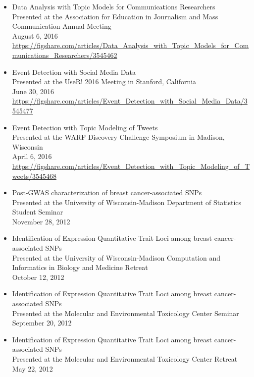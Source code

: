 \begin{itemize}
\item Data Analysis with Topic Models for Communications Researchers \\
Presented at the Association for Education in Journalism and Mass Communication Annual Meeting\\
August 6, 2016\\
\url{https://figshare.com/articles/Data_Analysis_with_Topic_Models_for_Communications_Researchers/3545462}

\item Event Detection with Social Media Data\\
Presented at the UseR! 2016 Meeting in Stanford, California\\
June 30, 2016\\
\url{https://figshare.com/articles/Event_Detection_with_Social_Media_Data/3545477}

\item Event Detection with Topic Modeling of Tweets\\
Presented at the WARF Discovery Challenge Symposium in Madison, Wisconsin\\
April 6, 2016\\
\url{https://figshare.com/articles/Event_Detection_with_Topic_Modeling_of_Tweets/3545468}


\item Post-GWAS characterization of breast cancer-associated SNPs \\
Presented at the University of Wisconsin-Madison Department of Statistics Student Seminar\\
November 28, 2012

\item Identification of Expression Quantitative Trait Loci among breast cancer-associated SNPs\\
Presented at the University of Wisconsin-Madison Computation and Informatics in Biology and Medicine Retreat\\
October 12, 2012


\item Identification of Expression Quantitative Trait Loci among breast cancer-associated SNPs\\
Presented at the Molecular and Environmental Toxicology Center Seminar\\
September 20, 2012


\item Identification of Expression Quantitative Trait Loci among breast cancer-associated SNPs\\
Presented at the Molecular and Environmental Toxicology Center Retreat\\
May 22, 2012

\end{itemize}